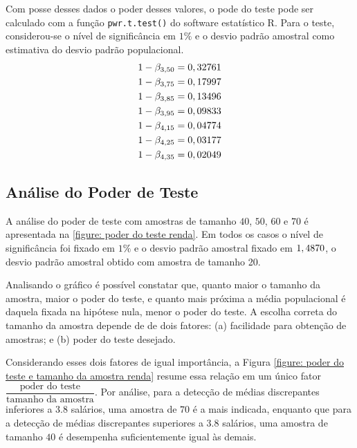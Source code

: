 	Com posse desses dados o poder desses valores, o pode do teste pode ser
	calculado com a função \texttt{pwr.t.test()} do software estatístico R.	Para o
	teste, considerou-se o nível de significância em $1\%$ e o desvio padrão
	amostral como estimativa do desvio padrão populacional.
	\begin{align*}
		1 - \beta_{3,50} &= 0,32761\\
		1 - \beta_{3,75} &= 0,17997\\
		1 - \beta_{3,85} &= 0,13496\\
		1 - \beta_{3,95} &= 0,09833\\
		1 - \beta_{4,15} &= 0,04774\\
		1 - \beta_{4,25} &= 0,03177\\
		1 - \beta_{4,35} &= 0,02049\\
	\end{align*}

\subsection{Análise do Poder de Teste}

	A análise do poder de teste com amostras de tamanho $40$, $50$, $60$ e $70$
	é apresentada na \autoref{figure: poder do teste renda}. Em todos os casos o
	nível de significância foi fixado em $1\%$ e o desvio padrão amostral fixado
	em $1,4870$, o desvio padrão amostral obtido com amostra de
	tamanho 20.

	Analisando o gráfico é possível constatar que, quanto maior o tamanho da
	amostra, maior o poder do teste, e quanto mais próxima a média populacional
	é daquela fixada na hipótese nula, menor o poder do teste. A escolha correta
	do tamanho da amostra depende de de dois fatores: (a) facilidade para
	obtenção de amostras; e (b) poder do teste desejado.
	
	Considerando esses dois fatores de igual importância, a Figura
	\autoref{figure: poder do teste e tamanho da amostra renda} resume essa
	relação em um único fator $\dfrac{\text{poder do teste}}{\text{tamanho da
	amostra}}$. Por análise, para a detecção de médias discrepantes inferiores a
	$3.8$ salários, uma amostra de $70$ é a mais indicada, enquanto que para a
	detecção de médias discrepantes superiores a $3.8$ salários, uma amostra de
	tamanho $40$ é desempenha suficientemente igual às demais.

